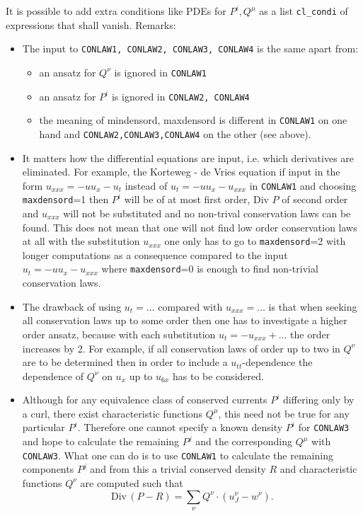 \documentclass[12pt]{article}
\begin{document}
It is possible to add extra conditions like PDEs for $P^i, Q^{\mu}$ as a list
{\tt cl\_condi} of expressions that shall vanish. \hspace{6pt}
\noindent Remarks:
\begin{itemize}
\item The input to {\tt CONLAW1, CONLAW2, CONLAW3, CONLAW4} is the
same apart from:
\begin{itemize}
\item an ansatz for $Q^{\nu}$ is ignored in {\tt CONLAW1}
\item an ansatz for $P^i$ is ignored in {\tt CONLAW2, CONLAW4}
\item the meaning of mindensord, maxdensord is different in {\tt CONLAW1}
on one hand and {\tt CONLAW2,CONLAW3,CONLAW4} on the other (see above).
\end{itemize}

\item
It matters how the differential equations are input, i.e. which
derivatives are eliminated. For example, the Korteweg - de Vries
equation if input in the form $u_{xxx}=-uu_x-u_t$ instead of
$u_t=-uu_x-u_{xxx}$
in {\tt CONLAW1} and choosing {\tt maxdensord}=1 then
$P^i$ will be of at most first order, Div $P$ of second order and $u_{xxx}$
will not be substituted and no non-trival conservation laws can be found.
This does not mean that one will not find low order conservation laws at
all with the substitution $u_{xxx}$ one only has to go to
{\tt maxdensord}=2 with longer computations as a consequence compared to the
input $u_t=-uu_x-u_{xxx}$ where {\tt maxdensord}=0 is enough to find
non-trivial conservation laws.

\item The drawback of using $u_t=\ldots$ compared with $u_{xxx}=\ldots$
is that when seeking all conservation laws up to some order
then one has to investigate a higher order ansatz, because with each
substitution $u_t=-u_{xxx}+\ldots$ the order increases by 2.
For example, if all conservation laws of order up to two in $Q^{\nu}$
are to be determined then in order to include a $u_{tt}$-dependence the
dependence of $Q^{\nu}$ on $u_x$ up to $u_{6x}$ has to be considered.

\item Although for any equivalence class of conserved currents $P^i$
differing only by a curl, there exist characteristic functions $Q^{\mu}$,
this need not be true for any particular $P^i$.
Therefore one cannot specify a known density $P^i$ for {\tt CONLAW3}
and hope to calculate the remaining $P^j$ and the corresponding $Q^{\mu}$
with {\tt CONLAW3}. What one
can do is to use {\tt CONLAW1} to calculate the remaining components
$P^j$ and from this a trivial conserved
density $R$ and characteristic functions $Q^{\nu}$ are computed such that
\[ \mbox{Div}\,(P-R) = \sum_{\nu} Q^{\nu}\cdot (u^{\nu}_J - w^{\nu}). \]


\end{itemize}
\end{document}
